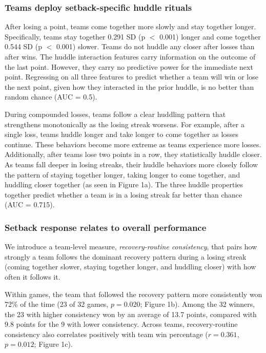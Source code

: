 \documentclass[12pt]{article}          %
\begin{document}
\subsubsection{Teams deploy setback-specific huddle rituals}

After losing a point, teams come together more slowly and stay together longer. Specifically, teams stay together 0.291 SD (p $<$ 0.001) longer and come together 0.544 SD (p $<$ 0.001) slower. Teams do not huddle any closer after losses than after wins. The huddle interaction features carry information on the outcome of the last point. However, they carry no predictive power for the immediate next point. Regressing on all three features to predict whether a team will win or lose the next point, given how they interacted in the prior huddle, is no better than random chance (AUC = 0.5). 

During compounded losses, teams follow a clear huddling pattern that strengthens monotonically as the losing streak worsens. For example, after a single loss, teams huddle longer and take longer to come together as losses continue. These behaviors become more extreme as teams experience more losses. Additionally, after teams lose two points in a row, they statistically huddle closer. As teams fall deeper in losing streaks, their huddle behaviors more closely follow the pattern of staying together longer, taking longer to come together, and huddling closer together (as seen in Figure 1a). The three huddle properties together predict whether a team is in a losing streak far better than chance (AUC = 0.715).

\subsubsection{Setback response relates to overall performance}

We introduce a team-level measure, \textit{recovery-routine consistency}, that pairs how strongly a team follows the dominant recovery pattern during a losing streak (coming together slower, staying together longer, and huddling closer) with how often it follows it.

Within games, the team that followed the recovery pattern more consistently won 72\% of the time (23 of 32 games, $p = 0.020$; Figure 1b). Among the 32 winners, the 23 with higher consistency won by an average of 13.7 points, compared with 9.8 points for the 9 with lower consistency. Across teams, recovery-routine consistency also correlates positively with team win percentage ($r = 0.361$, $p = 0.012$; Figure 1c).
\end{document}
